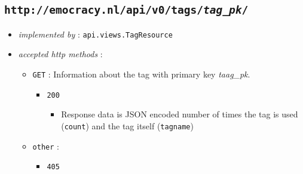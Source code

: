 \documentclass[a4paper]{report}
\begin{document}
\subsection{\texttt{http://emocracy.nl/api/v0/tags/\emph{tag\_pk}/}}
\begin{itemize}
    \item{\textsl{implemented by} : \texttt{api.views.TagResource}}
    \item{\textsl{accepted http methods} :
        \begin{itemize}
            \item{\texttt{GET} : Information about the tag with primary key \emph{taag\_pk}.
                \begin{itemize}
                    \item{\texttt{200}
                    \begin{itemize}
                        \item{Response data is JSON encoded number of times the
                        tag is used (\texttt{count}) and the tag itself (\texttt{tagname})}
                    \end{itemize}
                    }
                \end{itemize}
            }
            
            \item{\texttt{other} :
                \begin{itemize}
                    \item{\texttt{405}}
                \end{itemize}
            }
        \end{itemize}
    }
\end{itemize}
\end{document}
